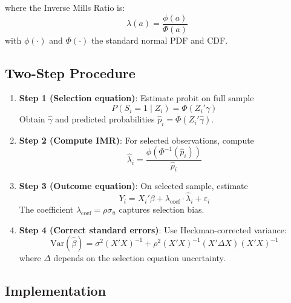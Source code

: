 where the Inverse Mills Ratio is:
\begin{equation}
\lambda(a) = \frac{\phi(a)}{\Phi(a)}
\end{equation}
with $\phi(\cdot)$ and $\Phi(\cdot)$ the standard normal PDF and CDF.

\subsection{Two-Step Procedure}

\begin{algorithm}
\label{alg:heckman}
\begin{enumerate}
\item \textbf{Step 1 (Selection equation)}: Estimate probit on full sample
\begin{equation}
P(S_i = 1 \mid Z_i) = \Phi(Z_i'\gamma)
\end{equation}
Obtain $\hat{\gamma}$ and predicted probabilities $\hat{p}_i = \Phi(Z_i'\hat{\gamma})$.

\item \textbf{Step 2 (Compute IMR)}: For selected observations, compute
\begin{equation}
\hat{\lambda}_i = \frac{\phi(\Phi^{-1}(\hat{p}_i))}{\hat{p}_i}
\end{equation}

\item \textbf{Step 3 (Outcome equation)}: On selected sample, estimate
\begin{equation}
Y_i = X_i'\beta + \lambda_{\text{coef}} \cdot \hat{\lambda}_i + \varepsilon_i
\end{equation}
The coefficient $\lambda_{\text{coef}} = \rho \sigma_u$ captures selection bias.

\item \textbf{Step 4 (Correct standard errors)}: Use Heckman-corrected variance:
\begin{equation}
\text{Var}(\hat{\beta}) = \sigma^2 (X'X)^{-1} + \rho^2 (X'X)^{-1}(X'\Delta X)(X'X)^{-1}
\end{equation}
where $\Delta$ depends on the selection equation uncertainty.
\end{enumerate}
\end{algorithm}

\subsection{Implementation}

